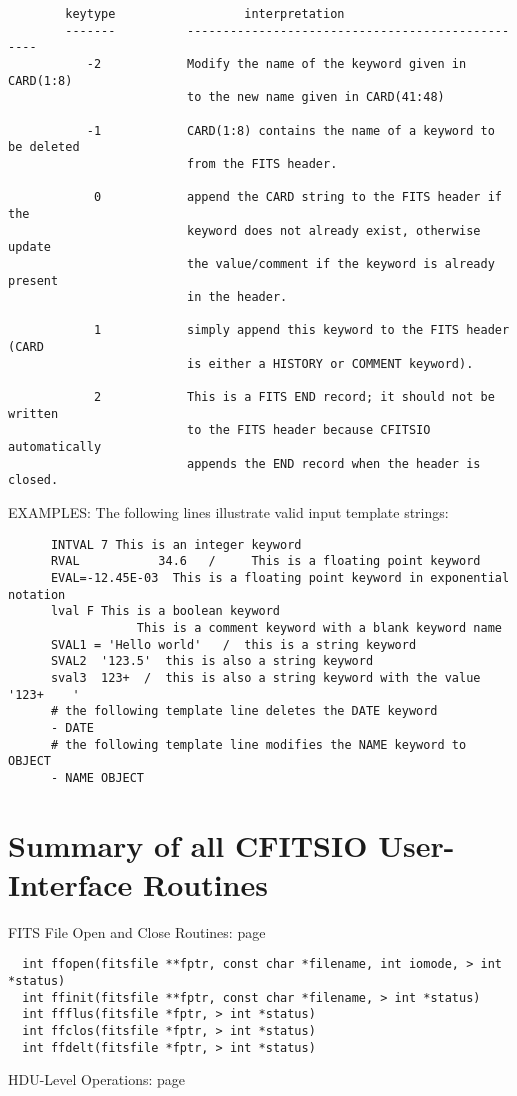 \begin{verbatim}
        keytype                  interpretation
        -------          -------------------------------------------------
           -2            Modify the name of the keyword given in CARD(1:8)
                         to the new name given in CARD(41:48)

           -1            CARD(1:8) contains the name of a keyword to be deleted
                         from the FITS header.

            0            append the CARD string to the FITS header if the
                         keyword does not already exist, otherwise update
                         the value/comment if the keyword is already present
                         in the header.

            1            simply append this keyword to the FITS header (CARD
                         is either a HISTORY or COMMENT keyword).

            2            This is a FITS END record; it should not be written
                         to the FITS header because CFITSIO automatically
                         appends the END record when the header is closed.
\end{verbatim}
     EXAMPLES:  The following lines illustrate valid input template strings:

\begin{verbatim}
      INTVAL 7 This is an integer keyword
      RVAL           34.6   /     This is a floating point keyword
      EVAL=-12.45E-03  This is a floating point keyword in exponential notation
      lval F This is a boolean keyword
                  This is a comment keyword with a blank keyword name
      SVAL1 = 'Hello world'   /  this is a string keyword
      SVAL2  '123.5'  this is also a string keyword
      sval3  123+  /  this is also a string keyword with the value '123+    '
      # the following template line deletes the DATE keyword
      - DATE
      # the following template line modifies the NAME keyword to OBJECT
      - NAME OBJECT
\end{verbatim}

\chapter{   Summary of all CFITSIO User-Interface Routines }

 FITS File Open and Close Routines: page~\pageref{FFOPEN}

\begin{verbatim}
  int ffopen(fitsfile **fptr, const char *filename, int iomode, > int *status)
  int ffinit(fitsfile **fptr, const char *filename, > int *status)
  int ffflus(fitsfile *fptr, > int *status)
  int ffclos(fitsfile *fptr, > int *status)
  int ffdelt(fitsfile *fptr, > int *status)
\end{verbatim}
 HDU-Level Operations: page~\pageref{FFMAHD}

